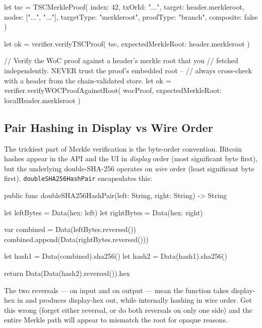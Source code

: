\documentclass[a4paper, 11pt, openany]{book}
\begin{document}
\begin{forthbox}
let tsc = TSCMerkleProof(
    index: 42,
    txOrId: "...",
    target: header.merkleroot,
    nodes: ["...", "..."],
    targetType: "merkleroot",
    proofType: "branch",
    composite: false
)

let ok = verifier.verifyTSCProof(
    tsc,
    expectedMerkleRoot: header.merkleroot
)
\end{forthbox}

\begin{forthbox}
// Verify the WoC proof against a header's merkle root that you
// fetched independently. NEVER trust the proof's embedded root --
// always cross-check with a header from the chain-validated store.
let ok = verifier.verifyWOCProofAgainstRoot(
    wocProof,
    expectedMerkleRoot: localHeader.merkleroot
)
\end{forthbox}

\subsection{Pair Hashing in Display vs Wire Order}

The trickiest part of Merkle verification is the byte-order convention. Bitcoin hashes appear in the API and the UI in \emph{display} order (most significant byte first), but the underlying double-SHA-256 operates on \emph{wire} order (least significant byte first). \texttt{doubleSHA256HashPair} encapsulates this:

\begin{forthbox}
public func doubleSHA256HashPair(left: String, right: String) -> String {
    let leftBytes = Data(hex: left)
    let rightBytes = Data(hex: right)

    var combined = Data(leftBytes.reversed())
    combined.append(Data(rightBytes.reversed()))

    let hash1 = Data(combined).sha256()
    let hash2 = Data(hash1).sha256()

    return Data(Data(hash2).reversed()).hex
}
\end{forthbox}

The two reversals --- on input and on output --- mean the function takes display-hex in and produces display-hex out, while internally hashing in wire order. Get this wrong (forget either reversal, or do both reversals on only one side) and the entire Merkle path will appear to mismatch the root for opaque reasons.
\end{document}
